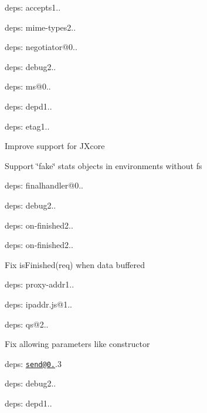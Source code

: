 {\ttfamily 
\begin{DoxyItemize}
\item deps\+: accepts1..
\begin{DoxyItemize}
\item deps\+: mime-\/types2..
\item deps\+: negotiator@0..
\end{DoxyItemize}
\item deps\+: debug2..
\begin{DoxyItemize}
\item deps\+: ms@0..
\end{DoxyItemize}
\item deps\+: depd1..
\item deps\+: etag1..
\begin{DoxyItemize}
\item Improve support for J\+Xcore
\item Support \char`\"{}fake\char`\"{} stats objects in environments without {\ttfamily fs}
\end{DoxyItemize}
\item deps\+: finalhandler@0..
\begin{DoxyItemize}
\item deps\+: debug2..
\item deps\+: on-\/finished2..
\end{DoxyItemize}
\item deps\+: on-\/finished2..
\begin{DoxyItemize}
\item Fix {\ttfamily is\+Finished(req)} when data buffered
\end{DoxyItemize}
\item deps\+: proxy-\/addr1..
\begin{DoxyItemize}
\item deps\+: ipaddr.\+js@1..
\end{DoxyItemize}
\item deps\+: qs@2..
\begin{DoxyItemize}
\item Fix allowing parameters like {\ttfamily constructor}
\end{DoxyItemize}
\item deps\+: \href{mailto:send@0.12}{\tt send@0.}.3
\begin{DoxyItemize}
\item deps\+: debug2..
\item deps\+: depd1..

\end{DoxyItemize}
\end{DoxyItemize}}
